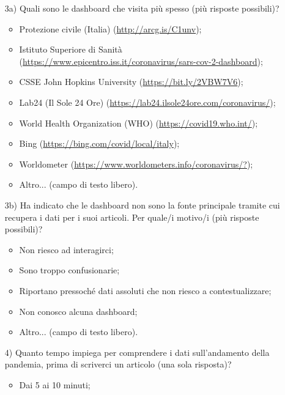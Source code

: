 \begin{itemize}
    \item[3a)] Quali sono le dashboard che visita più spesso (più risposte possibili)?
    \begin{itemize}
        \item Protezione civile (Italia) (\href{http://arcg.is/C1unv}{http://arcg.is/C1unv});
        \item Istituto Superiore di Sanità (\href{https://www.epicentro.iss.it/coronavirus/sars-cov-2-dashboard}{https://www.epicentro.iss.it/coronavirus/sars-cov-2-dashboard});
        \item CSSE John Hopkins University (\href{https://bit.ly/2VBW7V6}{https://bit.ly/2VBW7V6});
        \item Lab24 (Il Sole 24 Ore) (\href{https://lab24.ilsole24ore.com/coronavirus/}{https://lab24.ilsole24ore.com/coronavirus/});
        \item World Health Organization (WHO) (\href{https://covid19.who.int/}{https://covid19.who.int/});
        \item Bing (\href{https://bing.com/covid/local/italy}{https://bing.com/covid/local/italy});
        \item Worldometer (\href{https://www.worldometers.info/coronavirus/?}{https://www.worldometers.info/coronavirus/?});
        \item Altro... (campo di testo libero).
    \end{itemize}
    \item[3b)] Ha indicato che le dashboard non sono la fonte principale tramite cui recupera i dati per i suoi articoli. Per quale/i motivo/i (più risposte possibili)?
    \begin{itemize}
        \item Non riesco ad interagirci;
        \item Sono troppo confusionarie;
        \item Riportano pressoché dati assoluti che non riesco a contestualizzare;
        \item Non conosco alcuna dashboard;
        \item Altro... (campo di testo libero).
    \end{itemize}
    \item[4)] Quanto tempo impiega per comprendere i dati sull'andamento della pandemia, prima di scriverci un articolo (una sola risposta)?
    \begin{itemize}
        \item Dai 5 ai 10 minuti;

\end{itemize}
\end{itemize}
